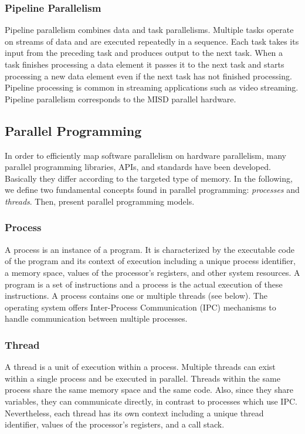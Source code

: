 \subsubsection{Pipeline Parallelism}

Pipeline parallelism combines data and task parallelisms. Multiple tasks operate on streams of data and are executed repeatedly in a sequence. Each task takes its input from the preceding task and produces output to the next task. When a task finishes processing a data element it passes it to the next task and starts processing a new data element even if the next task has not finished processing. Pipeline processing is common in streaming applications such as video streaming. Pipeline parallelism corresponds to the MISD parallel hardware. 

\subsection{Parallel Programming}

In order to efficiently map software parallelism on hardware parallelism, many parallel programming libraries, APIs, and standards have been developed. Basically they differ according to the targeted type of memory. In the following, we define two fundamental concepts found in parallel programming: \textit{processes} and \textit{threads}. Then, present parallel programming models.

\subsubsection{Process}

A process is an instance of a program. It is characterized by the executable code of the program and its context of execution including a unique process identifier, a memory space, values of the processor's registers, and other system resources. A program is a set of instructions and a process is the actual execution of these instructions. A process contains one or multiple threads (see below). The operating system offers Inter-Process Communication (IPC) mechanisms to handle communication between multiple processes.

\subsubsection{Thread}

A thread is a unit of execution within a process. Multiple threads can exist within a single process and be executed in parallel. Threads within the same process share the same memory space and the same code. Also, since they share variables, they can communicate directly, in contrast to processes which use IPC. Nevertheless, each thread has its own context including a unique thread identifier, values of the processor's registers, and a call stack.

